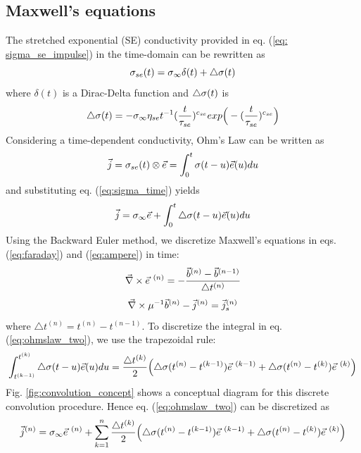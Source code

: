 \subsection{Maxwell's equations}
\label{app: Maxwell's equations}
The stretched exponential (SE) conductivity provided in eq. (\ref{eq: sigma_se_impulse}) in the time-domain can be rewritten as
\begin{equation}
  \sigma_{se}(t) = \sigma_\infty \delta (t) + \triangle\sigma (t)
  \label{eq:sigma_time}
\end{equation}
where  $\delta(t)$ is a Dirac-Delta function and $\triangle\sigma(t)$ is
\begin{equation}
  \triangle\sigma (t) = -\sigma_\infty \eta_{se}t^{-1}(\frac{t}{\tau_{se}})^{c_{se}}exp\Big(-(\frac{t}{\tau_{se}})^{c_{se}}\Big)
\end{equation}
Considering a time-dependent conductivity, Ohm's Law can be written as
\begin{equation}
  {\vec j} = \sigma_{se}(t) \otimes {\vec e} =\int_0^t \sigma(t-u) {\vec e} (u) du
  \label{eq:ohmslaw}
\end{equation}
and substituting eq. (\ref{eq:sigma_time}) yields
\begin{equation}
  {\vec j} = \sigma_\infty {\vec e} + \int_0^t \triangle\sigma(t-u) {\vec e} (u) du
  \label{eq:ohmslaw_two}
\end{equation}
Using the Backward Euler method, we discretize Maxwell's equations in eqs. (\ref{eq:faraday}) and (\ref{eq:ampere}) in time:
\begin{equation}
  {\vec \nabla}\times {\vec e}^{\ (n)} = -\frac{{\vec b}^{(n)}-{\vec b}^{(n-1)}}{\triangle t^{(n)}}
  \label{eq:faraday_time}
\end{equation}
\begin{equation}
  {\vec \nabla}\times \mu^{-1} {\vec b}^{(n)} - {\vec j}^{(n)} = {\vec j}_s^{(n)} \\
  \label{eq:ampere_time}
\end{equation}
where $\triangle t^{(n)} = t^{(n)}- t^{(n-1)}$.
To discretize the integral in eq. (\ref{eq:ohmslaw_two}), we use the trapezoidal rule:
\begin{equation}
  \int_{t^{(k-1)}}^{t^{(k)}} \dsig(t-u) \e (u) du
  = \frac{\triangle t^{(k)}}{2} \Big(\dsig (t^{(n)} - t^{(k-1)}) \e^{\ (k-1)} + \dsig (t^{(n)} - t^{(k)}) \e^{\ (k)} \Big)
  \label{eq:convolution_trapezoidal}
\end{equation}
Fig. \ref{fig:convolution_concept} shows a conceptual diagram for this discrete convolution procedure.
Hence eq. (\ref{eq:ohmslaw_two}) can be discretized as
\begin{equation}
  {\vec j}^{(n)} = \sigma_\infty {\vec e}^{\ (n)} +
  \sum_{k=1}^{n} \frac{\triangle t^{(k)}}{2} \Big(\triangle\sigma (t^{(n)} - t^{(k-1)}) {\vec e}^{\ (k-1)} + \triangle\sigma (t^{(n)} - t^{(k)}) {\vec e}^{\ (k)} \Big)
  \label{eq:ohmslaw_time_original}
\end{equation}
